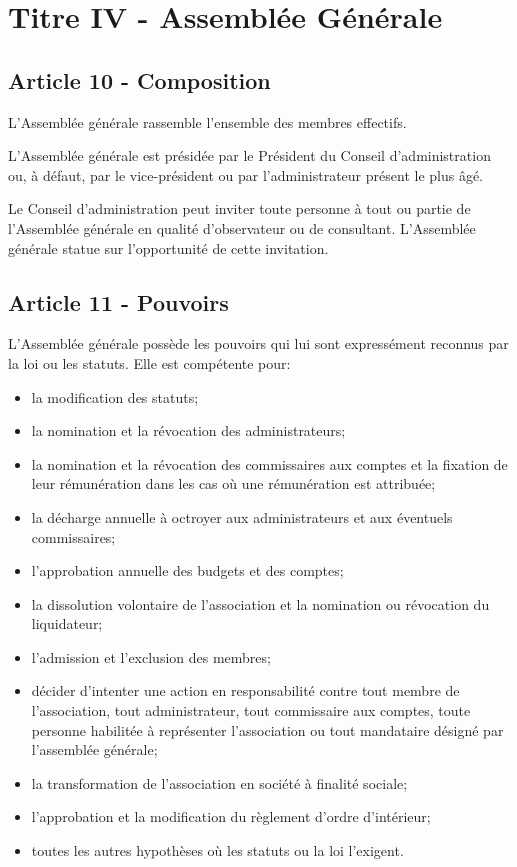 \documentclass[12pt]{article}
\begin{document}
\section*{Titre IV - Assemblée Générale}
\subsection*{Article 10 - Composition}
L'Assemblée générale rassemble l'ensemble des membres effectifs.

L'Assemblée générale est présidée par le Président du Conseil d'administration ou, à défaut, par le vice-président ou par l'administrateur présent le plus âgé.

Le Conseil d'administration peut inviter toute personne à tout ou partie de l'Assemblée générale en qualité d'observateur ou de consultant. L'Assemblée générale statue sur l'opportunité de cette invitation.
\subsection*{Article 11 - Pouvoirs}
L'Assemblée générale possède les pouvoirs qui lui sont expressément reconnus par la loi ou les statuts.
 Elle est compétente pour:
\begin{itemize}
\item la modification des statuts;
\item la nomination et la révocation des administrateurs;
\item la nomination et la révocation des commissaires aux comptes et la fixation de leur rémunération dans les cas où une rémunération est attribuée;
\item la décharge annuelle à octroyer aux administrateurs et aux éventuels commissaires;
\item l'approbation annuelle des budgets et des comptes;
\item la dissolution volontaire de l'association et la nomination ou révocation du liquidateur;
\item l'admission et l'exclusion des membres;
\item décider d'intenter une action en responsabilité contre tout membre de l'association, tout administrateur, tout commissaire aux comptes, toute personne habilitée à représenter l'association ou tout mandataire désigné par l'assemblée générale;
\item la transformation de l'association en société à finalité sociale;
\item l'approbation et la modification du règlement d'ordre d'intérieur;
\item toutes les autres hypothèses où les statuts ou la loi l'exigent.
\end{itemize}
\end{document}
